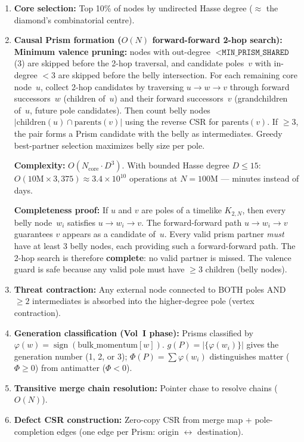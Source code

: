 \documentclass[11pt, a4paper, openany]{book}
\newcommand{\code}[1]{\texttt{#1}}
\begin{document}
\begin{enumerate}
  \item \textbf{Core selection:} Top 10\% of nodes by undirected Hasse degree
        ($\approx$ the diamond's combinatorial centre).
  \item \textbf{Causal Prism formation ($O(N)$ forward-forward 2-hop search):}
        \textbf{Minimum valence pruning:} nodes with out-degree
        $< \code{MIN\_PRISM\_SHARED}$ (3) are skipped before the 2-hop
        traversal, and candidate poles~$v$ with in-degree $< 3$ are skipped
        before the belly intersection.  For each remaining core node~$u$,
        collect 2-hop candidates by traversing $u \to w \to v$ through forward
        successors~$w$ (children of~$u$) and their forward successors~$v$
        (grandchildren of~$u$, future pole candidates).  Then count belly
        nodes $|\text{children}(u) \cap \text{parents}(v)|$ using the reverse
        CSR for $\text{parents}(v)$.  If $\ge 3$, the pair forms a Prism
        candidate with the belly as intermediates.  Greedy best-partner
        selection maximizes belly size per pole.

        \textbf{Complexity:} $O(N_{\text{core}} \cdot D^3)$.  With bounded Hasse
        degree $D \le 15$: $O(10\text{M} \times 3{,}375) \approx 3.4 \times 10^{10}$
        operations at $N = 100$M --- minutes instead of days.

        \textbf{Completeness proof:} If $u$ and $v$ are poles of a timelike
        $K_{2,N}$, then every belly node~$w_i$ satisfies $u \to w_i \to v$.
        The forward-forward path $u \to w_i \to v$ guarantees $v$ appears as a
        candidate of~$u$.  Every valid prism partner \emph{must} have at least
        3 belly nodes, each providing such a forward-forward path.  The 2-hop
        search is therefore \textbf{complete}: no valid partner is missed.
        The valence guard is safe because any valid pole must have $\ge 3$
        children (belly nodes).
  \item \textbf{Threat contraction:} Any external node connected to BOTH poles
        AND $\ge 2$ intermediates is absorbed into the higher-degree pole (vertex
        contraction).
  \item \textbf{Generation classification (Vol~I phase):} Prisms classified
        by $\varphi(w) = \operatorname{sign}(\text{bulk\_momentum}[w])$.
        $g(P) = |\{\varphi(w_i)\}|$ gives the generation number (1, 2, or 3);
        $\Phi(P) = \sum \varphi(w_i)$ distinguishes matter ($\Phi \ge 0$)
        from antimatter ($\Phi < 0$).
  \item \textbf{Transitive merge chain resolution:} Pointer chase to resolve
        chains ($O(N)$).
  \item \textbf{Defect CSR construction:} Zero-copy CSR from merge map +
        pole-completion edges (one edge per Prism: origin $\leftrightarrow$ destination).
\end{enumerate}
\end{document}

